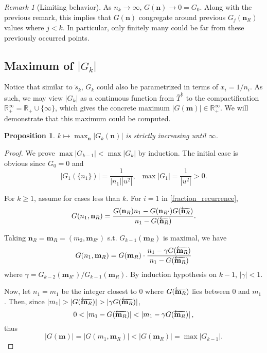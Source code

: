 \documentclass{article}
\theoremstyle{definition}
\theoremstyle{plain}
\newtheorem{proposition}{Proposition}[section]
\theoremstyle{remark}
\newtheorem*{remark}{Remark}
\numberwithin{equation}{section}
\newcommand{\bR}{\mathbb{R}}
\newcommand{\abs}[1]{\left\lvert{#1}\right\rvert}
\begin{document}
\begin{remark}[Limiting behavior]
  As $n_k \to \infty$, $G(\mathbf{n}) \to 0 = G_0$.
  Along with the previous remark,
  this implies that $G(\mathbf{n})$ congregate around previous $G_{j}(\mathbf{n}_R)$ values where $j < k$.
  In particular, only finitely many could be far from these previously occurred points.
\end{remark}

\subsection{Maximum of $\abs{G_k}$}

Notice that similar to $\tilde{s}_k$,
$G_k$ could also be parametrized in terms of $x_i = 1 / n_i$.
As such, we may view $\abs{G_k}$ as a continuous function
from $\bar{T}^{k}$ to the compactification $\bR_{+}^\infty = \bR_{+} \cup \{ \infty \}$,
which gives the concrete maximum $\abs{G(\mathbf{m})} \in \bR_{+}^\infty$.
We will demonstrate that this maximum could be computed.

\begin{proposition}\label{fraction_max_increase}
  $k \mapsto \max_{\mathbf{n}} \abs{G_k(\mathbf{n})}$ is strictly increasing until $\infty$.
\end{proposition}
\begin{proof}
  We prove $\max \abs{G_{k-1}} < \max \abs{G_{k}}$ by induction.
  The initial case is obvious since $G_0 = 0$ and
  \[ \abs{G_1(\{n_1\})} = \frac{1}{\abs{n_1} \abs{u^2}}, \;\; \max \abs{G_1} = \frac{1}{\abs{u^2}} > 0. \]

  For $k \geq 1$, assume for cases less than $k$.
  For $i = 1$ in \ref{fraction_recurrence},
  \[
    G(n_1, \mathbf{n}_R)
    = \frac{G(\mathbf{n}_R) n_1 - G(\mathbf{n}_{R'}) G(\overleftarrow{\mathbf{n}_R})}{n_1 - G(\overleftarrow{\mathbf{n}_R})}.
  \]

  Taking $\mathbf{n}_R = \mathbf{m}_R = (m_2, \mathbf{m}_{R'})$ s.t. $G_{k-1}(\mathbf{m}_R)$ is maximal, we have
  \[
    G(n_1, \mathbf{m}_R) = G(\mathbf{m}_R) \cdot \frac{n_1 - \gamma G(\overleftarrow{\mathbf{m}_R})}{n_1 - G(\overleftarrow{\mathbf{m}_R})}
  \]
  where $\gamma = G_{k-2}(\mathbf{m}_{R'}) / G_{k-1}(\mathbf{m}_R)$.
  By induction hypothesis on $k-1$, $\abs{\gamma} < 1$.

  Now, let $n_1 = m_1$ be the integer closest to $0$ where $G(\overleftarrow{\mathbf{m}_R})$ lies between $0$ and $m_1$.
  Then, since $\abs{m_1} > \abs{G(\rev{\mathbf{m}_R})} > \abs{\gamma G(\rev{\mathbf{m}_R})}$,
  \[
    0 < \abs{m_1 - G(\rev{\mathbf{m}_R})} < \abs{m_1 - \gamma  G(\rev{\mathbf{m}_R})},
  \]
  thus
  \[
    \abs{G(\mathbf{m})} = \abs{G(m_1, \mathbf{m}_R)} < \abs{G(\mathbf{m}_R)} = \max \abs{G_{k-1}}.
  \]
\end{proof}
\end{document}
